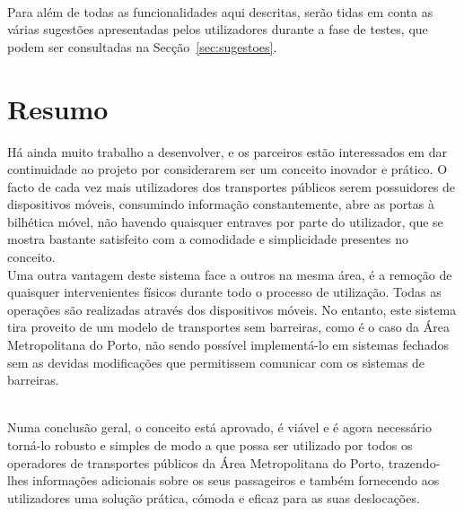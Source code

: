 ~\\Para além de todas as funcionalidades aqui descritas, serão tidas em conta as várias sugestões apresentadas pelos utilizadores durante a fase de testes, que podem ser consultadas na Secção~\ref{sec:sugestoes}.

\section{Resumo}

Há ainda muito trabalho a desenvolver, e os parceiros estão interessados em dar continuidade ao projeto por considerarem ser um conceito inovador e prático. O facto de cada vez mais utilizadores dos transportes públicos serem possuidores de dispositivos móveis, consumindo informação constantemente, abre as portas à bilhética móvel, não havendo quaisquer entraves por parte do utilizador, que se mostra bastante satisfeito com a comodidade e simplicidade presentes no conceito.
\\Uma outra vantagem deste sistema face a outros na mesma área, é a remoção de quaisquer intervenientes físicos durante todo o processo de utilização. Todas as operações são realizadas através dos dispositivos móveis. No entanto, este sistema tira proveito de um modelo de transportes sem barreiras, como é o caso da Área Metropolitana do Porto, não sendo possível implementá-lo em sistemas fechados sem as devidas modificações que permitissem comunicar com os sistemas de barreiras.

~\\Numa conclusão geral, o conceito está aprovado, é viável e é agora necessário torná-lo robusto e simples de modo a que possa ser utilizado por todos os operadores de transportes públicos da Área Metropolitana do Porto, trazendo-lhes informações adicionais sobre os seus passageiros e também fornecendo aos utilizadores uma solução prática, cómoda e eficaz para as suas deslocações.